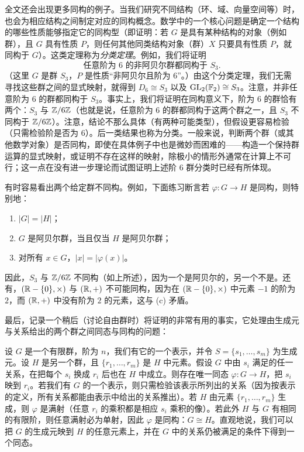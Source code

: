 全文还会出现更多同构的例子。当我们研究不同结构（环、域、向量空间等）时，也会为相应结构之间制定对应的同构概念。数学中的一个核心问题是确定一个结构的哪些性质能够指定它的同构型（即证明：若 $G$ 是具有某种结构的对象（例如群），且 $G$ 具有性质 $P$，则任何其他同类结构对象（群）$X$ 只要具有性质 $P$，就同构于 $G$）。这类定理称为\emph{分类定理}。例如，我们将证明
\[
  \text{任意阶为 }6\text{ 的非阿贝尔群都同构于 }S_3.
\]
（这里 $G$ 是群 $S_3$，$P$ 是性质“非阿贝尔且阶为 $6$”。）由这个分类定理，我们无需寻找这些群之间的显式映射，就得到 $D_6\cong S_3$ 以及 $\operatorname{GL}_2(\mathbb{F}_2)\cong S_3$。注意，并非任意阶为 $6$ 的群都同构于 $S_3$。事实上，我们将证明在同构意义下，阶为 $6$ 的群恰有两个：$S_3$ 与 $\mathbb{Z}/6\mathbb{Z}$（也就是说，任意阶为 $6$ 的群都同构于这两个群之一，且 $S_3$ 不同构于 $\mathbb{Z}/6\mathbb{Z}$）。注意，结论不那么具体（有两种可能类型），但假设更容易检验（只需检验阶是否为 $6$）。后一类结果也称为分类。一般来说，判断两个群（或其他数学对象）是否同构，即使在具体例子中也是微妙而困难的——构造一个保持群运算的显式映射，或证明不存在这样的映射，除极小的情形外通常在计算上不可行；这一点在没有进一步理论而试图证明上述阶 $6$ 群分类时已经有所体现。

有时容易看出两个给定群不同构。例如，下面练习断言若 $\varphi:G\to H$ 是同构，则特别地：
\begin{enumerate}[label=(\alph*)]
  \item $|G|=|H|$；
  \item $G$ 是阿贝尔群，当且仅当 $H$ 是阿贝尔群；
  \item 对所有 $x\in G$，$|x|=|\varphi(x)|$。
\end{enumerate}
因此，$S_3$ 与 $\mathbb{Z}/6\mathbb{Z}$ 不同构（如上所述），因为一个是阿贝尔的，另一个不是。还有，$(\mathbb{R}-\{0\},\times)$ 与 $(\mathbb{R},+)$ 不可能同构，因为在 $(\mathbb{R}-\{0\},\times)$ 中元素 $-1$ 的阶为 $2$，而 $(\mathbb{R},+)$ 中没有阶为 $2$ 的元素，这与 (c) 矛盾。

最后，记录一个稍后（讨论自由群时）将证明的非常有用的事实，它处理由生成元与关系给出的两个群之间同态与同构的问题：

设 $G$ 是一个有限群，阶为 $n$，我们有它的一个表示，并令 $S=\{s_1,\ldots,s_m\}$ 为生成元。设 $H$ 是另一个群，且 $\{r_1,\ldots,r_m\}$ 是 $H$ 中元素。假设 $G$ 中由 $s_i$ 满足的任一关系，在把每个 $s_i$ 换成 $r_i$ 后也在 $H$ 中成立。则存在唯一同态 $\varphi:G\to H$，把 $s_i$ 映到 $r_i$。若我们有 $G$ 的一个表示，则只需检验该表示所列出的关系（因为按表示的定义，所有关系都能由表示中给出的关系推出）。若 $H$ 由元素 $\{r_1,\ldots,r_m\}$ 生成，则 $\varphi$ 是满射（任意 $r_i$ 的乘积都是相应 $s_i$ 乘积的像）。若此外 $H$ 与 $G$ 有相同的有限阶，则任意满射必为单射，因此 $\varphi$ 是同构：$G\cong H$。直观地说，我们可以把 $G$ 的生成元映到 $H$ 的任意元素上，并在 $G$ 中的关系仍被满足的条件下得到一个同态。

